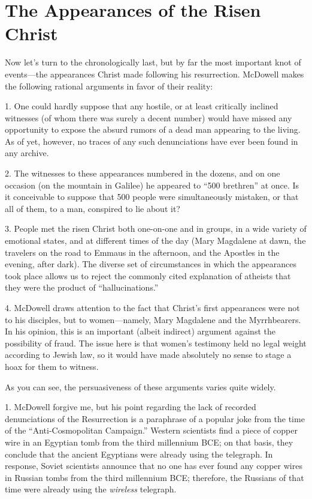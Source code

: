 \chapter*{The Appearances of the Risen Christ}


Now let's turn to the chronologically last, but by far the most important knot of events---the appearances Christ made following his resurrection. McDowell makes the following rational arguments in favor of their reality:

1. One could hardly suppose that any hostile, or at least critically inclined witnesses (of whom there was surely a decent number) would have missed any opportunity to expose the absurd rumors of a dead man appearing to the living. As of yet, however, no traces of any such denunciations have ever been found in any archive.

2. The witnesses to these appearances numbered in the dozens, and on one occasion (on the mountain in Galilee) he appeared to ``500 brethren'' at once. Is it conceivable to suppose that 500 people were simultaneously mistaken, or that all of them, to a man, conspired to lie about it?

3. People met the risen Christ both one-on-one and in groups, in a wide variety of emotional states, and at different times of the day (Mary Magdalene at dawn, the travelers on the road to Emmaus in the afternoon, and the Apostles in the evening, after dark). The diverse set of circumstances in which the appearances took place allows us to reject the commonly cited explanation of atheists that they were the product of ``hallucinations.''

4. McDowell draws attention to the fact that Christ's first appearances were not to his disciples, but to women---namely, Mary Magdalene and the Myrrhbearers. In his opinion, this is an important (albeit indirect) argument against the possibility of fraud. The issue here is that women's testimony held no legal weight according to Jewish law, so it would have made absolutely no sense to stage a hoax for them to witness.

As you can see, the persuasiveness of these arguments varies quite widely.

1. McDowell forgive me, but his point regarding the lack of recorded denunciations of the Resurrection is a paraphrase of a popular joke from the time of the ``Anti-Cosmopolitan Campaign.'' Western scientists find a piece of copper wire in an Egyptian tomb from the third millennium BCE; on that basis, they conclude that the ancient Egyptians were already using the telegraph. In response, Soviet scientists announce that no one has ever found any copper wires in Russian tombs from the third millennium BCE; therefore, the Russians of that time were already using the \emph{wireless} telegraph.

